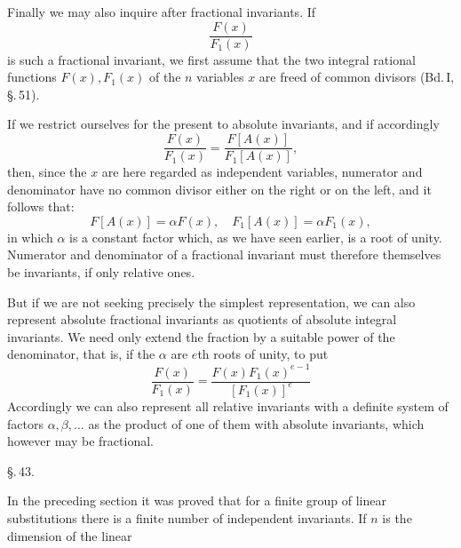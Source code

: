 Finally we may also inquire after fractional invariants. If
\[
\frac{F(x)}{F_1(x)}
\]
is such a fractional invariant, we first assume that the two integral rational functions $F(x), F_1(x)$ of the $n$ variables $x$ are freed of common divisors (Bd.\,I, \S.\,51).

If we restrict ourselves for the present to absolute invariants, and if accordingly
\[
\frac{F(x)}{F_1(x)} = \frac{F[A(x)]}{F_1[A(x)]},
\]
then, since the $x$ are here regarded as independent variables, numerator and denominator have no common divisor either on the right or on the left, and it follows that:
\[
F[A(x)] = \alpha F(x), \quad F_1[A(x)] = \alpha F_1(x),
\]
in which $\alpha$ is a constant factor which, as we have seen earlier, is a root of unity. Numerator and denominator of a fractional invariant must therefore themselves be invariants, if only relative ones.

But if we are not seeking precisely the simplest representation, we can also represent absolute fractional invariants as quotients of absolute integral invariants. We need only extend the fraction by a suitable power of the denominator, that is, if the $\alpha$ are $e$th roots of unity, to put
\[
\frac{F(x)}{F_1(x)} = \frac{F(x) F_1(x)^{e-1}}{[F_1(x)]^e}
\]
Accordingly we can also represent all relative invariants with a definite system of factors $\alpha, \beta, \ldots$ as the product of one of them with absolute invariants, which however may be fractional.

\begin{center}
\S.\,43.

\end{center}

In the preceding section it was proved that for a finite group of linear substitutions there is a finite number of independent invariants. If $n$ is the dimension of the linear
